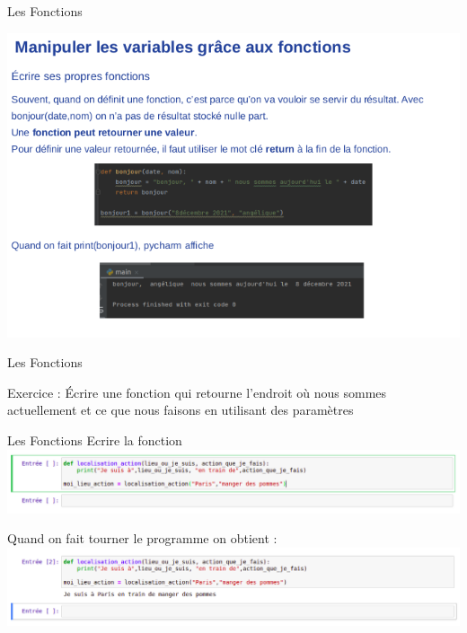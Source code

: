 \documentclass[xcolor=table]{beamer}
\begin{document}
\begin{frame}{Les Fonctions}

\includegraphics[scale=0.5]{images/fonction-4.png}
    
\end{frame}

\begin{frame}{Les Fonctions}

Exercice :
Écrire une fonction qui retourne l’endroit où nous sommes actuellement et ce que nous faisons en utilisant des paramètres
    
\end{frame}


\begin{frame}{Les Fonctions}
Ecrire la fonction 
\includegraphics[scale=0.3]{images/fonction_1.png}
\pause

\vspace{1cm}
Quand on fait tourner le programme on obtient : 
\includegraphics[scale=0.3]{images/fonction2.png}

\end{frame}
\end{document}
